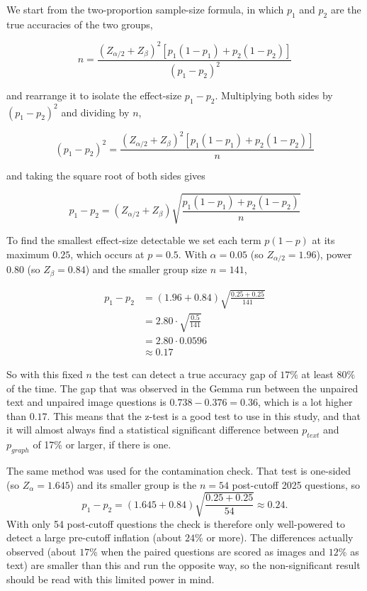\documentclass{article}
\begin{document}
We start from the two-proportion sample-size formula, in which $p_1$ and $p_2$ are the true accuracies of the two groups,

$$n = \frac{(Z_{\alpha/2} + Z_{\beta})^2 \left[ p_1(1 - p_1) + p_2(1 - p_2) \right]}{(p_1 - p_2)^2}$$

and rearrange it to isolate the effect-size $p_1 - p_2$. Multiplying both sides by $(p_1 - p_2)^2$ and dividing by $n$,

$$(p_1 - p_2)^2 = \frac{(Z_{\alpha/2} + Z_{\beta})^2 \left[ p_1(1 - p_1) + p_2(1 - p_2) \right]}{n}$$

and taking the square root of both sides gives

$$p_1 - p_2 = (Z_{\alpha/2} + Z_{\beta})\sqrt{\frac{p_1(1 - p_1) + p_2(1 - p_2)}{n}}$$

To find the smallest effect-size detectable we set each term $p(1-p)$ at its maximum $0.25$, which occurs at $p = 0.5$. With $\alpha = 0.05$ (so $Z_{\alpha/2} = 1.96$), power $0.80$ (so $Z_{\beta} = 0.84$) and the smaller group size $n = 141$,

\begin{align*}
p_1 - p_2 &= (1.96 + 0.84)\sqrt{\frac{0.25 + 0.25}{141}} \\
&= 2.80 \cdot \sqrt{\frac{0.5}{141}} \\
&= 2.80 \cdot 0.0596 \\
&\approx 0.17
\end{align*}

So with this fixed $n$ the test can detect a true accuracy gap of $17$\% at least $80\%$ of the time. The gap that was observed in the Gemma run between the unpaired text and unpaired image questions is $0.738 - 0.376 = 0.36$, which is a lot higher than $0.17$. This means that the z-test is a good test to use in this study, and that it will almost always find a statistical significant difference between $p_{text}$ and $p_{graph}$ of 17\% or larger, if there is one.

The same method was used for the contamination check. That test is one-sided (so $Z_{\alpha} = 1.645$) and its smaller group is the $n = 54$ post-cutoff 2025 questions, so
$$p_1 - p_2 = (1.645 + 0.84)\sqrt{\frac{0.25 + 0.25}{54}} \approx 0.24.$$
With only 54 post-cutoff questions the check is therefore only well-powered to detect a large pre-cutoff inflation (about $24$\% or more). The differences actually observed (about $17$\% when the paired questions are scored as images and $12$\% as text) are smaller than this and run the opposite way, so the non-significant result should be read with this limited power in mind.
\end{document}

